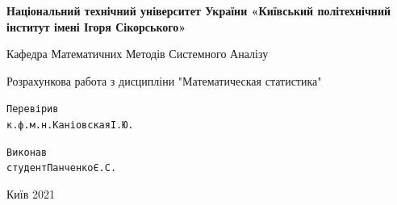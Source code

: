 \documentclass[14pt,a4paper]{scrartcl}
\theoremstyle{definition}
\theoremstyle{remark}
\theoremstyle{definition}
\theoremstyle{definition}
\begin{document}
\begin{titlepage}
    \newpage
    \begin{center}
    {\bfseries Національний технічний університет України «Київський політехнічний інститут імені Ігоря Сікорського»}
    \vspace{1cm}

    Кафедра Математичних Методів Системного Аналізу
    \vspace{6em}




    \end{center}

    \vspace{1.2em}

    \begin{center}
    \Large Розрахункова работа з дисципліни "Математическая статистика"
    \end{center}

    \vspace{5em}

    \begin{center}
     \end{center}
    \vspace{6em}


    \begin{alltt}
                                Перевірив
                                    к.ф.м.н. Каніовская І. Ю.


                                Виконав
                                    студент Панченко Є. С.
    \end{alltt}


    \vspace{\fill}

    \begin{center}
    Київ 2021
    \end{center}

    \end{titlepage}
\end{document}
